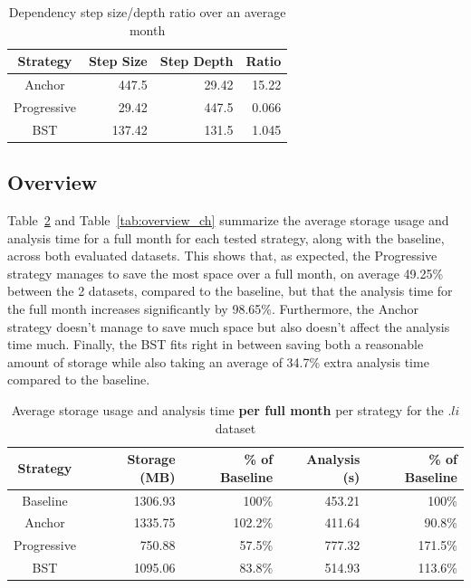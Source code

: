 \begin{table}
    \centering \caption{Dependency step size/depth ratio over an average month}
    \label{tab:ratio}
    \footnotesize
    \begin{tabular}{|c|r|r|r|} \hline
        Strategy    & Step Size & Step Depth & Ratio \\ \hline
        Anchor      & 447.5     & 29.42      & 15.22 \\
        Progressive & 29.42     & 447.5      & 0.066 \\
        BST         & 137.42    & 131.5      & 1.045 \\
    \hline\end{tabular}
    \vspace*{-0.5\baselineskip}
\end{table}


\subsection{Overview}

Table~\ref{tab:overview_li} and Table~\ref{tab:overview_ch} summarize the average storage usage and analysis time for a full month for each tested
strategy, along with the baseline, across both evaluated datasets. This shows that, as expected, the Progressive strategy manages to save the most space
over a full month, on average 49.25\% between the 2 datasets, compared to the baseline, but that the analysis time for the full month increases significantly
by 98.65\%. Furthermore, the Anchor strategy doesn't manage to save much space but also doesn't affect the analysis time much. Finally, the BST fits right
in between saving both a reasonable amount of storage while also taking an average of 34.7\% extra analysis time compared to the baseline. 

\begin{table}
    \centering \caption{Average storage usage and analysis time \textbf{per full month} per strategy for the $.li$ dataset}
    \label{tab:overview_li}
    \footnotesize
    \begin{tabular}{|c|r|r|r|r|} \hline
        Strategy    & Storage (MB) & \% of Baseline & Analysis (s) & \% of Baseline \\ \hline
        Baseline    & 1306.93            & 100\%            & 453.21            & 100\%            \\
        Anchor      & 1335.75            & 102.2\%          & 411.64            & 90.8\%           \\
        Progressive & 750.88             & 57.5\%           & 777.32            & 171.5\%          \\
        BST         & 1095.06            & 83.8\%           & 514.93            & 113.6\%          \\
    \hline\end{tabular}
    \vspace*{-1\baselineskip}
\end{table}

